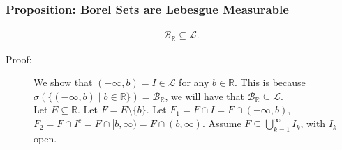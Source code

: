 \documentclass[10pt]{extarticle}
\newcommand{\R}{\mathbb{R}}
\begin{document}
  \subsubsection{Proposition: Borel Sets are Lebesgue Measurable}%
  \begin{align*}
    \mathcal{B}_{\R} \subseteq \mathcal{L}.  
  \end{align*}
  \begin{description}
    \item[Proof:] We show that $(-\infty,b) = I\in \mathcal{L}$ for any $b\in \R$. This is because $\sigma\left(\{(-\infty,b)\mid b\in\R\}\right) = \mathcal{B}_{\R}$, we will have that $\mathcal{B}_{\R}\subseteq \mathcal{L}$.\\

      Let $E\subseteq \R$. Let $F = E\setminus \{b\}$. Let $F_1 = F\cap I = F \cap (-\infty,b)$, $F_2 = F\cap I^{c} = F\cap [b,\infty) = F\cap (b,\infty)$. Assume $F \subseteq \bigcup_{k=1}^{\infty} I_k$, with $I_k$ open.\\


\end{description}
\end{document}
